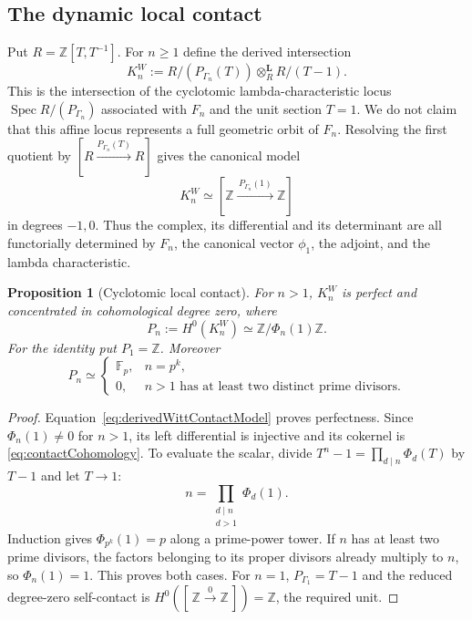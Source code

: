 \documentclass[11pt]{amsart}
\newtheorem{proposition}[theorem]{Proposition}
\theoremstyle{definition}
\theoremstyle{remark}
\newcommand{\Z}{\mathbb Z}
\begin{document}
\subsection{The dynamic local contact}

Put $R=\Z[T,T^{-1}]$.  For $n\geq1$ define the derived intersection
\begin{equation}\label{eq:derivedWittContact}
 K_n^W:=
 R/(P_{\Gamma_n}(T))
 \mathbin{\otimes_R^{\mathbf L}}R/(T-1).
\end{equation}
This is the intersection of the cyclotomic lambda-characteristic locus
$\operatorname{Spec}R/(P_{\Gamma_n})$ associated with $F_n$ and the unit
section $T=1$.  We do not claim that this affine locus represents a full
geometric orbit of $F_n$.  Resolving the first quotient by
$[R\xrightarrow{P_{\Gamma_n}(T)}R]$ gives the canonical model
\begin{equation}\label{eq:derivedWittContactModel}
 K_n^W\simeq
 [\Z\xrightarrow{\,P_{\Gamma_n}(1)\,}\Z]
\end{equation}
in degrees $-1,0$.  Thus the complex, its differential and its determinant
are all functorially determined by $F_n$, the canonical vector $\phi_1$,
the adjoint, and the lambda characteristic.

\begin{proposition}[Cyclotomic local contact]
\label{prop:cyclotomicFixedContact}
For $n>1$, $K_n^W$ is perfect and concentrated in cohomological degree
zero, where
\begin{equation}\label{eq:contactCohomology}
 P_n:=H^0(K_n^W)\simeq\Z/\Phi_n(1)\Z.
\end{equation}
For the identity put $P_1=\Z$.  Moreover
\begin{equation}\label{eq:cyclotomicAtOne}
 P_n\simeq
 \begin{cases}
  \mathbb F_p,&n=p^k,\\
  0,&n>1\text{ has at least two distinct prime divisors}.
 \end{cases}
\end{equation}
\end{proposition}

\begin{proof}
Equation~\eqref{eq:derivedWittContactModel} proves perfectness.  Since
$\Phi_n(1)\ne0$ for $n>1$, its left differential is injective and its
cokernel is \eqref{eq:contactCohomology}.  To evaluate the scalar, divide
$T^n-1=\prod_{d\mid n}\Phi_d(T)$ by $T-1$ and let $T\to1$:
\[
 n=\prod_{\substack{d\mid n\\d>1}}\Phi_d(1).
\]
Induction gives $\Phi_{p^k}(1)=p$ along a prime-power tower.  If $n$ has
at least two prime divisors, the factors belonging to its proper divisors
already multiply to $n$, so $\Phi_n(1)=1$.  This proves both cases.
For $n=1$, $P_{\Gamma_1}=T-1$ and the reduced degree-zero self-contact is
$H^0([\,\Z\xrightarrow0\Z\,])=\Z$, the required unit.
\end{proof}
\end{document}
